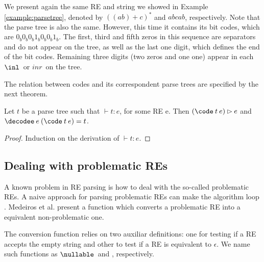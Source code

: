 \begin{Example}
We present again the same RE and string we showed in Example \ref{example:parsetree},
denoted by $((ab) + c)^*$ and $abcab$, respectively. Note that the parse tree is also the same.
However, this time it contains its bit codes, which are $0_b0_b0_b1_b0_b0_b1_b$. The first, third and fifth
zeros in this sequence are separators and do not appear on the tree, as well as the last one
digit, which defines the end of the bit codes. Remaining three digits (two zeros and one one)
appear in each $\inl\,$ or $inr\,$ on the tree.

\begin{center}
\end{center}

\end{Example}



The relation between codes and its correspondent parse trees are specified by the next
theorem.

\begin{Theorem}
  Let $t$ be a parse tree such that $\vdash t : e$, for some RE e. Then $(\code\: t\: e) \rhd e$ and
  $\decodee\: e\: (\code\: t\: e) = t$.
\end{Theorem}
\begin{proof}
  Induction on the derivation of $\vdash t : e$.
\end{proof}



\subsection{Dealing with problematic REs}


\label{subsection:problematic}


A known problem in RE parsing is how to deal with the so-called problematic REs. A naive approach for 
parsing problematic REs can make the algorithm loop \cite{Frisch2004}. Medeiros et al. \cite{Medeiros14}
present a function which converts a problematic RE into a equivalent non-problematic one.


The conversion function relies on two auxiliar definitions: one for testing if a RE accepts the empty string and 
other to test if a RE is equivalent to $\epsilon$. We name such functions as $\nullable\,$ and \emptyy, 
respectively.



